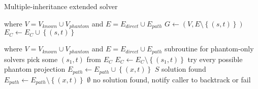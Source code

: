 \begin{algorithm} 
  \caption{Multiple-inheritance extended solver}
  \label{alg:multiple:ext}

  \hrulefill

  \begin{algorithmic}[1]
     where $V = V_{known} \cup V_{phantom}$ and $E = E_{direct} \cup E_{path}$
          \State $G \gets (V,E \setminus \left\{(s,t)\right\})$
            \State $E_C \gets E_C \cup \left\{(s,t)\right\}$
          \EndIf
        \EndIf
      \EndFor
      \State \Return {}
    \EndFunction
  \end{algorithmic}

  \hrulefill

  \begin{algorithmic}[1]
     where $V = V_{known} \cup V_{phantom}$ and $E = E_{direct} \cup E_{path}$
        \State {}
        \Comment subroutine for phantom-only solvers
      \Else
        \State pick some $(s_1,t)$ from $E_C$
        \State $E_C \gets E_C \setminus \left\{(s_1,t)\right\}$
         \Comment try every possible phantom projection
          \State $E_{path} \gets E_{path} \cup \left\{(x,t)\right\}$ 
            \Return $S$ \Comment solution found
          \EndIf
          \State  $E_{path} \gets E_{path} \setminus \left\{(x,t)\right\}$ 
        \EndFor
        \State \Return $\emptyset$ \Comment no solution found, notify caller to backtrack or fail
      \EndIf
    \EndFunction
  \end{algorithmic}

\end{algorithm} 

